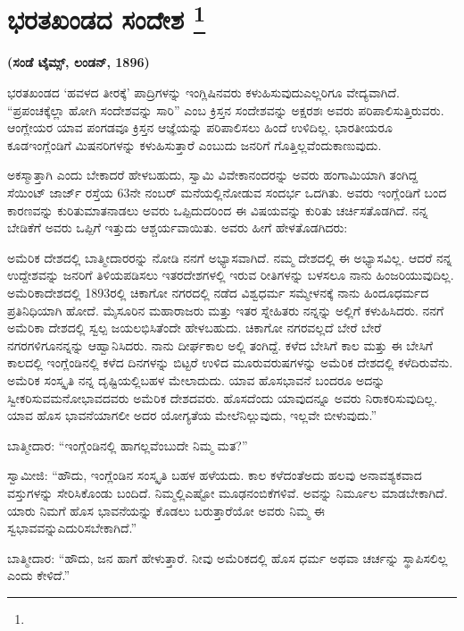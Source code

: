 
\chapter[ಭರತಖಂಡದ ಸಂದೇಶ ]{ಭರತಖಂಡದ ಸಂದೇಶ \protect\footnote{}}

\centerline{\textbf{(ಸಂಡೆ ಟೈಮ್ಸ್, ಲಂಡನ್​, 1896)}}

\vskip 0.4cm

ಭರತಖಂಡದ ‘ಹವಳದ ತೀರಕ್ಕೆ’ ಪಾದ್ರಿಗಳನ್ನು ಇಂಗ್ಲಿಷಿನವರು ಕಳುಹಿಸುವುದು\break ಎಲ್ಲರಿಗೂ ವೇದ್ಯವಾಗಿದೆ. “ಪ್ರಪಂಚಕ್ಕೆಲ್ಲಾ ಹೋಗಿ ಸಂದೇಶವನ್ನು ಸಾರಿ” ಎಂಬ ಕ್ರಿಸ್ತನ ಸಂದೇಶವನ್ನು ಅಕ್ಷರಶಃ ಅವರು ಪರಿಪಾಲಿಸುತ್ತಿರುವರು. ಆಂಗ್ಲೇಯರ ಯಾವ ಪಂಗ\-ಡವೂ ಕ್ರಿಸ್ತನ ಆಜ್ಞೆಯನ್ನು ಪರಿಪಾಲಿಸಲು ಹಿಂದೆ ಉಳಿದಿಲ್ಲ. ಭಾರತೀಯರೂ ಕೂಡ\break ಇಂಗ್ಲೆಂಡಿಗೆ ಮಿಷನರಿಗಳನ್ನು ಕಳುಹಿಸುತ್ತಾರೆ ಎಂಬುದು ಜನರಿಗೆ ಗೊತ್ತಿಲ್ಲವೆಂದು\break ಕಾಣುವುದು.

ಅಕಸ್ಮಾತ್ತಾಗಿ ಎಂದು ಬೇಕಾದರೆ ಹೇಳಬಹುದು, ಸ್ವಾಮಿ ವಿವೇಕಾನಂದರನ್ನು ಅವರು ಹಂಗಾಮಿಯಾಗಿ ತಂಗಿದ್ದ ಸೆಯಿಂಟ್​ ಜಾರ್ಜ್​ ರಸ್ತೆಯ 63ನೇ ನಂಬರ್​ ಮನೆಯಲ್ಲಿ\break ನೋಡುವ ಸಂದರ್ಭ ಒದಗಿತು. ಅವರು ಇಂಗ್ಲೆಂಡಿಗೆ ಬಂದ ಕಾರಣವನ್ನು ಕುರಿತು\break ಮಾತನಾಡಲು ಅವರು ಒಪ್ಪಿದುದರಿಂದ ಈ ವಿಷಯವನ್ನು ಕುರಿತು ಚರ್ಚಿಸತೊಡಗಿದೆ. ನನ್ನ ಬೇಡಿಕೆಗೆ ಅವರು ಒಪ್ಪಿಗೆ ಇತ್ತುದು ಆಶ್ಚರ್ಯವಾಯಿತು. ಅವರು ಹೀಗೆ ಹೇಳ\-ತೊಡಗಿದರು:

ಅಮೆರಿಕ ದೇಶದಲ್ಲಿ ಬಾತ್ಮೀದಾರರನ್ನು ನೋಡಿ ನನಗೆ ಅಭ್ಯಾಸವಾಗಿದೆ. ನಮ್ಮ ದೇಶದಲ್ಲಿ ಈ ಅಭ್ಯಾಸವಿಲ್ಲ. ಆದರೆ ನನ್ನ ಉದ್ದೇಶವನ್ನು ಜನರಿಗೆ ತಿಳಿಯಪಡಿಸಲು ಇತರ\break ದೇಶಗಳಲ್ಲಿ ಇರುವ ರೀತಿಗಳನ್ನು ಬಳಸಲೂ ನಾನು ಹಿಂಜರಿಯುವುದಿಲ್ಲ. ಅಮೆರಿಕಾ\break ದೇಶದಲ್ಲಿ 1893ರಲ್ಲಿ ಚಿಕಾಗೋ ನಗರದಲ್ಲಿ ನಡೆದ ವಿಶ್ವಧರ್ಮ ಸಮ್ಮೇಳನಕ್ಕೆ ನಾನು ಹಿಂದೂಧರ್ಮದ ಪ್ರತಿನಿಧಿಯಾಗಿ ಹೋದೆ. ಮೈಸೂರಿನ ಮಹಾರಾಜರು ಮತ್ತು ಇತರ ಸ್ನೇಹಿತರು ನನ್ನನ್ನು ಅಲ್ಲಿಗೆ ಕಳುಹಿಸಿದರು. ನನಗೆ ಅಮೆರಿಕಾ ದೇಶದಲ್ಲಿ ಸ್ವಲ್ಪ ಜಯ\break ಲಭಿಸಿತೆಂದೇ ಹೇಳಬಹುದು. ಚಿಕಾಗೋ ನಗರವಲ್ಲದೆ ಬೇರೆ ಬೇರೆ ನಗರಗಳಿಗೂ\break ನನ್ನನ್ನು ಆಹ್ವಾನಿಸಿದರು. ನಾನು ದೀರ್ಘಕಾಲ ಅಲ್ಲಿ ತಂಗಿದ್ದೆ. ಕಳೆದ ಬೇಸಿಗೆ ಕಾಲ ಮತ್ತು ಈ ಬೇಸಿಗೆ ಕಾಲದಲ್ಲಿ ಇಂಗ್ಲೆಂಡಿನಲ್ಲಿ ಕಳೆದ ದಿನಗಳನ್ನು ಬಿಟ್ಟರೆ ಉಳಿದ ಮೂರು\break ವರುಷಗಳನ್ನು ಅಮೆರಿಕ ದೇಶದಲ್ಲಿ ಕಳೆದಿರುವೆನು. ಅಮೆರಿಕ ಸಂಸ್ಕೃತಿ ನನ್ನ ದೃಷ್ಟಿಯಲ್ಲಿ\break ಬಹಳ ಮೇಲಾದುದು. ಯಾವ ಹೊಸಭಾವನೆ ಬಂದರೂ ಅದನ್ನು ಸ್ವೀಕರಿಸುವ\break ಮನೋಭಾವದವರು ಅಮೆರಿಕ ದೇಶದವರು. ಹೊಸದೆಂದು ಯಾವುದನ್ನೂ ಅವರು ನಿರಾಕರಿಸುವುದಿಲ್ಲ. ಯಾವ ಹೊಸ ಭಾವನೆಯಾಗಲೀ ಅದರ ಯೋಗ್ಯತೆಯ ಮೇಲೆ\break ನಿಲ್ಲುವುದು, ಇಲ್ಲವೇ ಬೀಳುವುದು.”

ಬಾತ್ಮೀದಾರ: “ಇಂಗ್ಲೆಂಡಿನಲ್ಲಿ ಹಾಗಲ್ಲವೆಂಬುದೇ ನಿಮ್ಮ ಮತ?”

ಸ್ವಾಮೀಜಿ: “ಹೌದು, ಇಂಗ್ಲೆಂಡಿನ ಸಂಸ್ಕೃತಿ ಬಹಳ ಹಳೆಯದು. ಕಾಲ ಕಳೆದಂತೆ\break ಅದು ಹಲವು ಅನಾವಶ್ಯಕವಾದ ವಸ್ತುಗಳನ್ನು ಸೇರಿಸಿಕೊಂಡು ಬಂದಿದೆ. ನಿಮ್ಮಲ್ಲಿ\break ಎಷ್ಟೋ ಮೂಢನಂಬಿಕೆಗಳಿವೆ. ಅವನ್ನು ನಿರ್ಮೂಲ ಮಾಡಬೇಕಾಗಿದೆ. ಯಾರು ನಿಮಗೆ ಹೊಸ ಭಾವನೆಯನ್ನು ಕೊಡಲು ಬರುತ್ತಾರೆಯೋ ಅವರು ನಿಮ್ಮ ಈ ಸ್ವಭಾವವನ್ನು\break ಎದುರಿಸಬೇಕಾಗಿದೆ.”

ಬಾತ್ಮೀದಾರ: “ಹೌದು, ಜನ ಹಾಗೆ ಹೇಳುತ್ತಾರೆ. ನೀವು ಅಮೆರಿಕದಲ್ಲಿ ಹೊಸ ಧರ್ಮ ಅಥವಾ ಚರ್ಚನ್ನು ಸ್ಥಾಪಿಸಲಿಲ್ಲ ಎಂದು ಕೇಳಿದೆ.”

